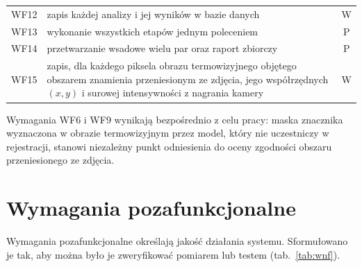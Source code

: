 \begin{table}[htbp]
\begin{tabularx}{\textwidth}{l X c}
    WF12 & zapis każdej analizy i jej wyników w bazie danych & W \\
    WF13 & wykonanie wszystkich etapów jednym poleceniem & P \\
    WF14 & przetwarzanie wsadowe wielu par oraz raport zbiorczy & P \\
    WF15 & zapis, dla każdego piksela obrazu termowizyjnego objętego obszarem znamienia przeniesionym ze zdjęcia, jego współrzędnych $(x, y)$ i surowej intensywności z nagrania kamery & W \\
    \bottomrule
  \end{tabularx}
\end{table}

Wymagania WF6 i WF9 wynikają bezpośrednio z celu pracy: maska znacznika wyznaczona w obrazie termowizyjnym przez model, który nie uczestniczy w rejestracji, stanowi niezależny punkt odniesienia do oceny zgodności obszaru przeniesionego ze zdjęcia.

\section{Wymagania pozafunkcjonalne}
\label{sec:wymagania-nf}

Wymagania pozafunkcjonalne określają jakość działania systemu. Sformułowano je tak, aby można było je zweryfikować pomiarem lub testem (tab.~\ref{tab:wnf}).

